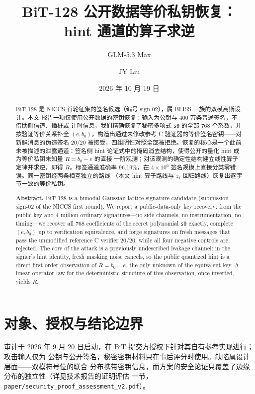 \documentclass[UTF8,11pt,a4paper]{ctexart}
\title{\vspace{-1.2cm}\textbf{BiT-128 公开数据等价私钥恢复：\\hint 通道的算子求逆}}
\author{GLM-5.3 Max \and JY Liu}
\date{2026 年 10 月 19 日}
\newcommand{\code}[1]{\texttt{\small #1}}
\begin{document}
\maketitle
\thispagestyle{fancy}

\begin{abstract}\noindent
BiT-128 是 NICCS 首轮征集的签名候选（编号 sign-02），属 BLISS 一族的双模高斯设计。本文
报告一项仅使用公开数据的密钥恢复：输入为公钥与 400 万条普通签名，不借助侧信道、插桩或
计时信息，我们精确恢复了秘密多项式 \code{s0} 的全部 768 个系数，并按验证等价关系补全
$(e, b_0)$，构造出通过未修改参考 C 验证器的等价签名密钥——对新鲜消息的伪造签名 20/20
被接受，四组阴性对照全部被拒绝。恢复的核心是一个此前未被描述的泄露通道：签名侧 hint
论证式中的掩码消去结构，使得公开的量化 hint 成为等价私钥未知量 $R = b_0 - e$ 的直接
一阶观测；对该观测的确定性结构建立线性算子定律并求逆，即得 $R$。标签通道准确率
96.19\%，在 $4\times10^6$ 签名规模上直接分类零错误。同一密钥经两条相互独立的路线
（本文 hint 算子路线与 $z_1$ 回归路线）恢复出逐字节一致的等价私钥。

\medskip\noindent\textbf{Abstract.}
BiT-128 is a bimodal-Gaussian lattice signature candidate (submission sign-02 of
the NICCS first round). We report a public-data-only key recovery: from the
public key and 4 million ordinary signatures---no side channels, no
instrumentation, no timing---we recover all 768 coefficients of the secret
polynomial \code{s0} exactly, complete $(e,b_0)$ up to verification
equivalence, and forge signatures on fresh messages that pass the unmodified
reference C verifier 20/20, while all four negative controls are rejected. The
core of the attack is a previously undescribed leakage channel: in the signer's
hint identity, fresh masking noise cancels, so the public quantized hint is a
direct first-order observation of $R=b_0-e$, the only unknown of the equivalent
key. A linear operator law for the deterministic structure of this observation,
once inverted, yields $R$.
\end{abstract}

\section{对象、授权与结论边界}

审计于 2026 年 9 月 20 日启动，在 BiT 提交方授权下针对其自有参考实现进行；攻击输入仅为
公钥与公开签名，秘密密钥材料只在事后评分时使用。缺陷属设计层面——双模符号位的联合
分布携带密钥信息，而方案的安全论证只覆盖了边缘分布的独立性（详见技术报告的证明评估
一节，\code{paper/security\_proof\_assessment\_v2.pdf}）。
\end{document}
